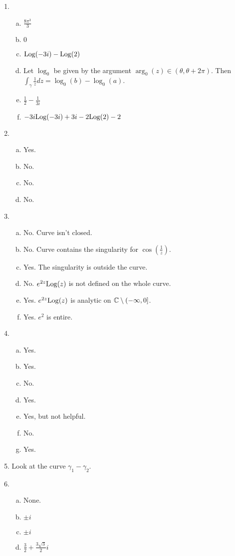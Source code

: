 \begin{enumerate}
\item \begin{enumerate}[a)]
\item $\frac{8\pi^3}{3}$
\item $0$
\item $\mathrm{Log}(-3i) - \mathrm{Log}(2)$
\item Let $\log_0$ be given by the argument $\arg_0(z) \in (\theta,\theta + 2\pi)$. Then $\int_{\gamma} \frac{1}{z}dz = \log_0(b) - \log_0(a)$.
\item $\frac{1}{2} - \frac{1}{3i}$
\item $-3i\mathrm{Log}(-3i) + 3i -2\mathrm{Log}(2) -2$
\end{enumerate}

\item \begin{enumerate}[a)]
\item Yes.
\item No.
\item No.
\item No.
\end{enumerate}

\item \begin{enumerate}[a)]
\item No. Curve isn't closed.
\item No. Curve contains the singularity for $\cos\left(\frac{1}{z}\right)$.
\item Yes. The singularity is outside the curve.
\item No. $e^{2z}\mathrm{Log}(z)$ is not defined on the whole curve.
\item Yes. $e^{2z}\mathrm{Log}(z)$ is analytic on $\mathbb{C}\setminus(-\infty,0]$.
\item Yes. $e^2$ is entire.
\end{enumerate}

\item \begin{enumerate}[a)]
\item Yes.
\item Yes.
\item No.
\item Yes.
\item Yes, but not helpful.
\item No.
\item Yes.
\end{enumerate}


\item Look at the curve $\gamma_1 - \gamma_2$.

\item \begin{enumerate}[a)]
\item None.
\item $\pm i$
\item $\pm i$
\item $\frac{3}{2} + \frac{3\sqrt{3}}{2}i$
\end{enumerate}


\end{enumerate}
